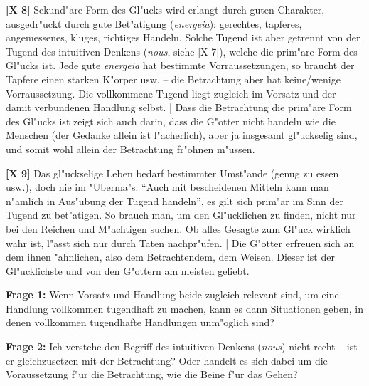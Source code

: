 \documentclass[a4paper]{article}
\begin{document}
\noindent \textbf{[X 8]} Sekund"are Form des Gl"ucks wird erlangt durch guten Charakter, ausgedr"uckt durch gute Bet"atigung (\emph{energeia}): gerechtes, tapferes, angemessenes, kluges, richtiges Handeln. Solche Tugend ist aber getrennt von der Tugend des intuitiven Denkens (\emph{nous}, siehe [X 7]), welche die prim"are Form des Gl"ucks ist. Jede gute \emph{energeia} hat bestimmte Vorraussetzungen, so braucht der Tapfere einen starken K"orper usw. -- die Betrachtung aber hat keine/wenige Vorraussetzung. Die vollkommene Tugend liegt zugleich im Vorsatz und der damit verbundenen Handlung selbst. | Dass die Betrachtung die prim"are Form des Gl"ucks ist zeigt sich auch darin, dass die G"otter nicht handeln wie die Menschen (der Gedanke allein ist l"acherlich), aber ja insgesamt gl"uckselig sind, und somit wohl allein der Betrachtung fr"ohnen m"ussen.\newline

\noindent \textbf{[X 9]} Das gl"uckselige Leben bedarf bestimmter Umst"ande (genug zu essen usw.), doch nie im "Uberma"s: "`Auch mit bescheidenen Mitteln kann man n"amlich in Aus"ubung der Tugend handeln"', es gilt sich prim"ar im Sinn der Tugend zu bet"atigen. So brauch man, um den Gl"ucklichen zu finden, nicht nur bei den Reichen und M"achtigen suchen. Ob alles Gesagte zum Gl"uck wirklich wahr ist, l"asst sich nur durch Taten nachpr"ufen. | Die G"otter erfreuen sich an dem ihnen "ahnlichen, also dem Betrachtendem, dem Weisen. Dieser ist der Gl"ucklichste und von den G"ottern am meisten geliebt.\newline

\noindent \textbf{Frage 1:} Wenn Vorsatz und Handlung beide zugleich relevant sind, um eine Handlung vollkommen tugendhaft zu machen, kann es dann Situationen geben, in denen vollkommen tugendhafte Handlungen unm"oglich sind? \newline

\noindent \textbf{Frage 2:} Ich verstehe den Begriff des intuitiven Denkens (\emph{nous}) nicht recht -- ist er gleichzusetzen mit der Betrachtung? Oder handelt es sich dabei um die Voraussetzung f"ur die Betrachtung, wie die Beine f"ur das Gehen?
\end{document}
